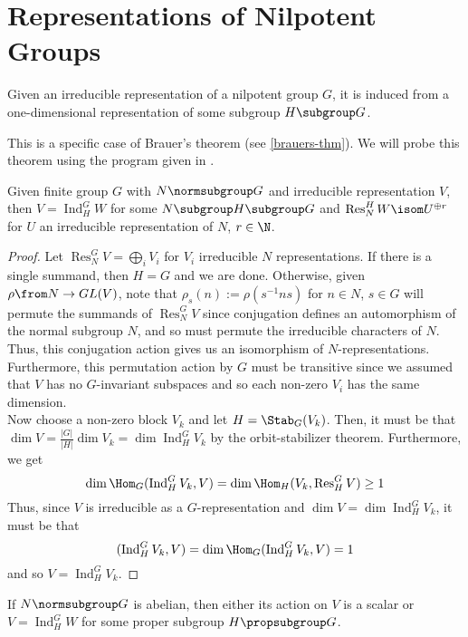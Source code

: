 \documentclass[11pt,leqno,oneside]{amsbook}
\newcommand{\Res}{\operatorname{Res}}
\newcommand{\Ind}{\operatorname{Ind}}
\numberwithin{thm}{section}
\begin{document}
\section{Representations of Nilpotent Groups}
\begin{thm}
  Given an irreducible representation of a nilpotent group \(G\), it is induced
  from a one-dimensional representation of some subgroup \(H \subgroup G\).
\end{thm}
\begin{rmk}
  This is a specific case of Brauer's theorem (see
  \ref{brauers-thm}). We will probe this theorem using the program
  given in \cite{ct}.
\end{rmk}
\begin{lem}
  Given finite group \(G\) with \(N \normsubgroup G\) and irreducible
  representation \(V\), then \(V = \Ind_H^G W\) for some \(N \subgroup H
  \subgroup G\) and \(\Res_N^H W \isom U^{\oplus r}\) for \(U\) an irreducible
  representation of \(N\), \(r \in \N\).
\end{lem}
\begin{proof}
  Let \(\Res_N^G V = \bigoplus_i V_i\) for \(V_i\) irreducible \(N\)
  representations. If there is a single summand, then \(H=G\) and we
  are done. Otherwise, given \(\rho \from N \to GL(V)\), note that
  \(\rho_s(n) := \rho(s^{-1}ns)\) for \(n \in N\), \(s \in G\) will
  permute the summands of \(\Res_N^G V\) since conjugation defines an
  automorphism of the normal subgroup \(N\), and so must permute the
  irreducible characters of \(N\). Thus, this conjugation action gives
  us an isomorphism of \(N\)-representations. Furthermore, this
  permutation action by \(G\) must be transitive since we assumed that \(V\)
  has no \(G\)-invariant subspaces and so each non-zero \(V_i\) has
  the same dimension. \\

  Now choose a non-zero block \(V_k\) and let \(H =
  \Stab_G(V_k)\). Then, it must be that \(\dim V = \frac{|G|}{|H|}
  \dim V_k = \dim \Ind_H^G V_k\) by the orbit-stabilizer theorem. Furthermore, we get \[
    \dim \Hom_G(\Ind_H^G V_k, V) = \dim \Hom_H(V_k, \Res_H^G V) \geq 1
  \]
  Thus, since \(V\) is irreducible as a \(G\)-representation and
  \(\dim V = \dim \Ind_H^G V_k\), it must be that \[
    (\Ind_H^G V_k, V) = \dim \Hom_G(\Ind_H^G V_k, V) = 1
  \]
  and so \(V = \Ind_H^G V_k\).
\end{proof}
\begin{cor}
  If \(N \normsubgroup G\) is abelian, then either its action on \(V\)
  is a scalar or \(V = \Ind_H^G W\) for some proper subgroup \(H
  \propsubgroup G\).
\end{cor}
\end{document}
